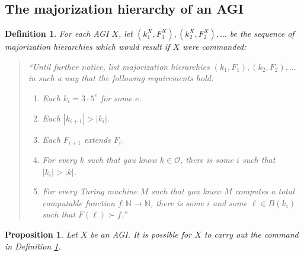 \documentclass{article}
\newtheorem{definition}[theorem]{Definition}
\newtheorem{proposition}[theorem]{Proposition}
\begin{document}
\subsection{The majorization hierarchy of an AGI}

\begin{definition}
\label{majorizationhierarchyofanagidefn}
    For each AGI $X$, let $(k^X_1,F^X_1),(k^X_2,F^X_2),\ldots$ be the sequence
    of majorization hierarchies which would result if $X$ were commanded:
    \begin{quote}
        ``Until further notice, list majorization hierarchies
        $(k_1,F_1),(k_2,F_2),\ldots$ in such a way that the following requirements
        hold:
        \begin{enumerate}
            \item
            Each $k_i=3\cdot 5^e$ for some $e$.
            \item
            Each $|k_{i+1}|>|k_i|$.
            \item
            Each $F_{i+1}$ extends $F_i$.
            \item
            For every $k$ such that you know $k\in\mathcal O$, there is some $i$
            such that $|k_i|>|k|$.
            \item
            For every Turing machine $M$ such that you know $M$ computes a total
            computable function $f:\mathbb N\to\mathbb N$, there is some
            $i$ and some $\ell \in B(k_i)$ such that $F(\ell)\succ f$.''
        \end{enumerate}
    \end{quote}
\end{definition}

\begin{proposition}
    Let $X$ be an AGI. It is possible for $X$ to carry out the command in
    Definition \ref{majorizationhierarchyofanagidefn}.
\end{proposition}
\end{document}

